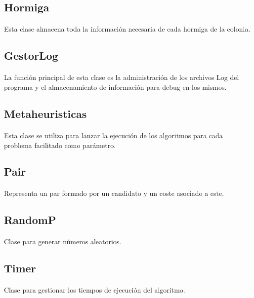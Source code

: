 	\subsection{Hormiga}
	
	\paragraph{}Esta clase almacena toda la información necesaria de cada hormiga de la colonia.
	
	\subsection{GestorLog}
	
	\paragraph{}La función principal de esta clase es la administración de los archivos Log del programa y el almacenamiento de información para debug en los mismos.
	
	\subsection{Metaheuristicas}
	
	\paragraph{}Esta clase se utiliza para lanzar la ejecución de los algoritmos para cada problema facilitado como parámetro.
	
	\subsection{Pair}
	
	\paragraph{}Representa un par formado por un candidato y un coste asociado a este.
	
	\subsection{RandomP}
	
	\paragraph{}Clase para generar números aleatorios.
	
	\subsection{Timer}
	
	\paragraph{}Clase para gestionar los tiempos de ejecución del algoritmo.